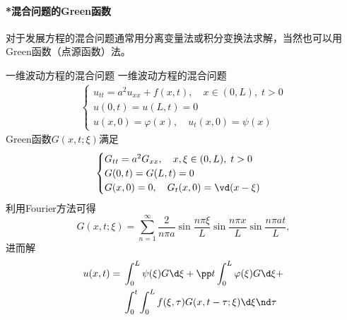 \paragraph{*混合问题的Green函数}对于发展方程的混合问题通常用分离变量法或积分变换法求解，当然也可以用Green函数（点源函数）法。
\begin{example}{一维波动方程的混合问题}{}
	一维波动方程的混合问题
	\begin{align*}
		\begin{cases}
			u_{tt}=a^2u_{xx}+f(x,t),\quad x\in(0,L),\;t>0\\
			u(0,t)=u(L,t)=0\\
			u(x,0)=\varphi(x),\quad u_t(x,0)=\psi(x)
		\end{cases}
	\end{align*}
	Green函数$G(x,t;\xi)$满足 
	\begin{align*}
		\begin{cases}
			G_{tt}=a^2G_{xx},\quad x,\xi\in(0,L),\;t>0\\
			G(0,t)=G(L,t)=0\\
			G(x,0)=0,\quad G_t(x,0)=\vd(x-\xi)
		\end{cases}
	\end{align*}
	利用Fourier方法可得
	\[
		G(x,t;\xi)=\sum_{n=1}^\infty\frac2{n\pi a}\sin\frac{n\pi\xi}L\sin\frac{n\pi x}L\sin\frac{n\pi at}L,
	\]
	进而解
	\begin{align}
		\begin{aligned}
			u(x,t)={}&\int_0^L\psi(\xi)G\d\xi+\pp t\int_0^L\varphi(\xi)G\d\xi+\\
			&\int_0^t\int_0^L f(\xi,\tau)G(x,t-\tau;\xi)\d\xi\nd\tau
		\end{aligned}
	\end{align}
\end{example}

% 
